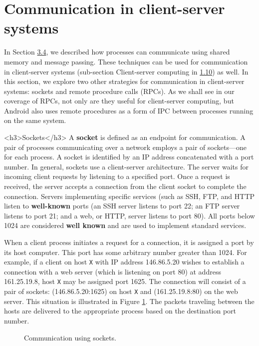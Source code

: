 \section{Communication in client-server systems}\label{sec:3.8}

In Section \hyperref[sec:3.4]{3.4}, we described how processes can communicate using shared memory and message passing. These techniques can be used for communication in client-server systems (sub-section Client-server computing in \hyperref[sec:1.10]{1.10}) as well. In this section, we explore two other strategies for communication in client-server systems: sockets and remote procedure calls (RPCs). As we shall see in our coverage of RPCs, not only are they useful for client-server computing, but Android also uses remote procedures as a form of IPC between processes running on the same system.

<h3>Sockets</h3>
A \textbf{socket} is defined as an endpoint for communication. A pair of processes communicating over a network employs a pair of sockets---one for each process. A socket is identified by an IP address concatenated with a port number. In general, sockets use a client-server architecture. The server waits for incoming client requests by listening to a specified port. Once a request is received, the server accepts a connection from the client socket to complete the connection. Servers implementing specific services (such as SSH, FTP, and HTTP listen to \textbf{well-known} ports (an SSH server listens to port 22; an FTP server listens to port 21; and a web, or HTTP, server listens to port 80). All ports below 1024 are considered \textbf{well known} and are used to implement standard services.

When a client process initiates a request for a connection, it is assigned a port by its host computer. This port has some arbitrary number greater than 1024. For example, if a client on host \texttt{X} with IP address 146.86.5.20 wishes to establish a connection with a web server (which is listening on port 80) at address 161.25.19.8, host \texttt{X} may be assigned port 1625. The connection will consist of a pair of sockets: (146.86.5.20:1625) on host \texttt{X} and (161.25.19.8:80) on the web server. This situation is illustrated in Figure \ref{fig:sockets-communication}. The packets traveling between the hosts are delivered to the appropriate process based on the destination port number.

\begin{figure}[h!]
\centering
\caption{Communication using sockets.}\label{fig:sockets-communication}
\end{figure}

